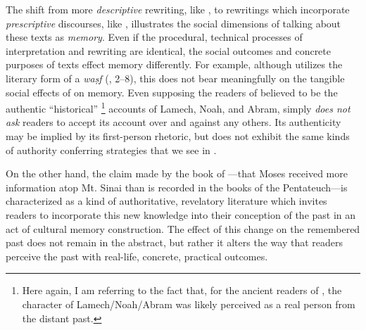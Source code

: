 The shift from more \emph{descriptive} rewriting, like \ga, to rewritings which incorporate \emph{prescriptive} discourses, like \jub, illustrates the social dimensions of talking about these texts as \emph{memory}. Even if the procedural, technical processes of interpretation and rewriting are identical, the social outcomes and concrete purposes of texts effect memory differently. For example, although \ga utilizes the literary form of a \emph{waṣf} (, 2--8), this does not bear meaningfully on the tangible social effects of \ga on memory. Even supposing the readers of \ga believed \ga to be the authentic ``historical''%
    \footnote{%
        Here again, I am referring to the fact that, for the ancient readers of \jub, the character of Lamech/Noah/Abram was likely perceived as a real person from the distant past.}
accounts of Lamech, Noah, and Abram, \ga simply \emph{does not ask} readers to accept its account over and against any others. Its authenticity may be implied by its first-person rhetoric, but \ga does not exhibit the same kinds of authority conferring strategies that we see in \jub. 

On the other hand, the claim made by the book of \jub---that Moses received more information atop Mt. Sinai than is recorded in the books of the Pentateuch---is characterized as a kind of authoritative, revelatory literature which invites readers to incorporate this new knowledge into their conception of the past in an act of cultural memory construction. The effect of this change on the remembered past does not remain in the abstract, but rather it alters the way that readers perceive the past with real-life, concrete, practical outcomes. 


